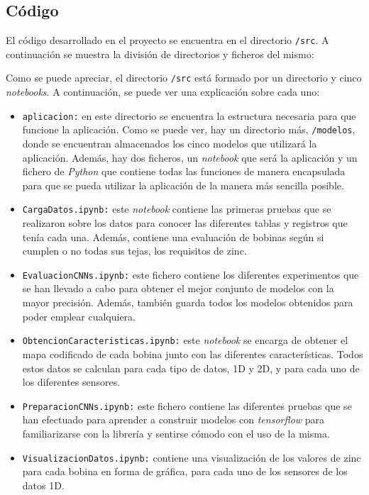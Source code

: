 \subsection{Código}
El código desarrollado en el proyecto se encuentra en el directorio \texttt{/src}. A continuación se muestra la división de directorios y ficheros del mismo:

Como se puede apreciar, el directorio \texttt{/src} está formado por un directorio y cinco \emph{notebooks}. A continuación, se puede ver una explicación sobre cada uno:

\begin{itemize}
    \item \texttt{aplicacion:} en este directorio se encuentra la estructura necesaria para que funcione la aplicación. Como se puede ver, hay un directorio más, \texttt{/modelos}, donde se encuentran almacenados los cinco modelos que utilizará la aplicación. Además, hay dos ficheros, un \emph{notebook} que será la aplicación y un fichero de \emph{Python} que contiene todas las funciones de manera encapsulada para que se pueda utilizar la aplicación de la manera más sencilla posible.
    \item \texttt{CargaDatos.ipynb:} este \emph{notebook} contiene las primeras pruebas que se realizaron sobre los datos para conocer las diferentes tablas y registros que tenía cada una. Además, contiene una evaluación de bobinas según si cumplen o no todas sus tejas, los requisitos de zinc.
    \item \texttt{EvaluacionCNNs.ipynb:} este fichero contiene los diferentes experimentos que se han llevado a cabo para obtener el mejor conjunto de modelos con la mayor precisión. Además, también guarda todos los modelos obtenidos para poder emplear cualquiera.
    \item \texttt{ObtencionCaracteristicas.ipynb:} este \emph{notebook} se encarga de obtener el mapa codificado de cada bobina junto con las diferentes características. Todos estos datos se calculan para cada tipo de datos, 1D y 2D, y para cada uno de los diferentes sensores.
    \item \texttt{PreparacionCNNs.ipynb:} este fichero contiene las diferentes pruebas que se han efectuado para aprender a construir modelos con \emph{tensorflow} para familiarizarse con la librería y sentirse cómodo con el uso de la misma.
    \item \texttt{VisualizacionDatos.ipynb:} contiene una visualización de los valores de zinc para cada bobina en forma de gráfica, para cada uno de los sensores de los datos 1D.
\end{itemize}

